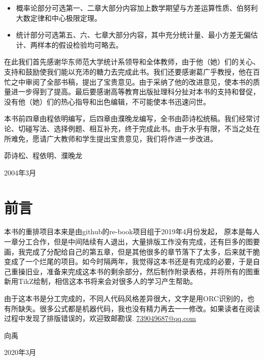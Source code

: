 \begin{itemize}
  \item 概率论部分可选第一、二章大部分内容加上数学期望与方差运算性质、伯努利大数定律和中心极限定理。
  \item 统计部分可选第五、六、七章大部分内容，其中充分统计量、最小方差无偏估计、两样本的假设检验均可略去。
\end{itemize}

在此我们首先感谢华东师范大学统计系领导和全体教师，由于他（她）们的关心、支持和鼓励使我们能以充沛的糖力去完成此书。我们还要感谢葛广乎教授，他在百忙之中审阅了全部书稿，提出了宝贵意见。由于采纳了他的改进意见，使本书的质量进一步得到了提高。最后要感谢高等教育出版扯理科分扯对本书的支持和督促，没有他（她）们的热心指导和出色编辑，不可能使本书迅速问世。

本书前四章由程依明编写，后四章由濮晚龙编写，全书由茆诗松统稿。我们经常讨论、切碰写法、选择例题、相互补充，终于完成此书。由于水乎有限，不当之处在所难免，愿请广大教师和学生提出宝贵意见，我们将作进一步改进。

\hfill 茆诗松、程依明、濮晚龙

\hfill 2004年3月 \hspace{0.8cm}

\chapter*{前言}
本书的重排项目本来是由github的re-book项目组于2019年4月份发起， 原本是每人一章分工合作，但是中间陆续有人退出，大量排版工作没有完成，还有巨多的图要画，我完成了分配给自己的第五章，但是其他很多的章节落下了太多，后来就干脆变成了一个烂尾的项目。如今时隔两年，我觉得这本书还是有完成的必要，于是自己重操旧业，准备来完成这本书的剩余部分，然后制作附录表格，并将所有的图重新用TikZ绘制，相信这本书将来会对很多人的学习产生帮助。

由于这本书是分工完成的，不同人代码风格差异很大，文字是用ORC识别的，也有所缺失。很多公式都是机器代码，我也没有精力再去一一修改。如果读者在阅读过程中发现了排版错误的，欢迎致邮勘误. \href{739049687@qq.com}{739049687@qq.com}

\hfill 向禹\hspace{2em}

\hfill 2020年3月
